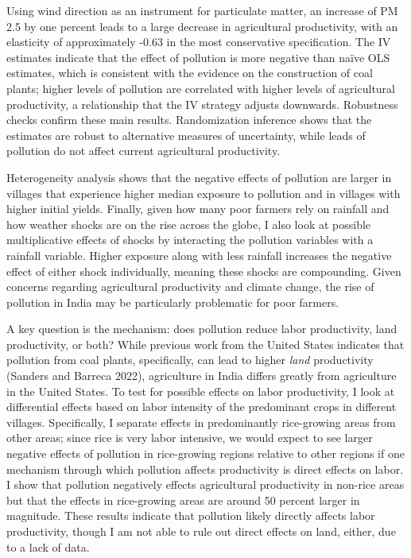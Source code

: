 \documentclass[
]{article}
\begin{document}
Using wind direction as an instrument for particulate matter, an increase of PM 2.5 by one percent leads to a large decrease in agricultural productivity, with an elasticity of approximately -0.63 in the most conservative specification. The IV estimates indicate that the effect of pollution is more negative than naïve OLS estimates, which is consistent with the evidence on the construction of coal plants; higher levels of pollution are correlated with higher levels of agricultural productivity, a relationship that the IV strategy adjusts downwards. Robustness checks confirm these main results. Randomization inference shows that the estimates are robust to alternative measures of uncertainty, while leads of pollution do not affect current agricultural productivity.

Heterogeneity analysis shows that the negative effects of pollution are larger in villages that experience higher median exposure to pollution and in villages with higher initial yields. Finally, given how many poor farmers rely on rainfall and how weather shocks are on the rise across the globe, I also look at possible multiplicative effects of shocks by interacting the pollution variables with a rainfall variable. Higher exposure along with less rainfall increases the negative effect of either shock individually, meaning these shocks are compounding. Given concerns regarding agricultural productivity and climate change, the rise of pollution in India may be particularly problematic for poor farmers.

A key question is the mechanism: does pollution reduce labor productivity, land productivity, or both? While previous work from the United States indicates that pollution from coal plants, specifically, can lead to higher \emph{land} productivity (Sanders and Barreca 2022), agriculture in India differs greatly from agriculture in the United States. To test for possible effects on labor productivity, I look at differential effects based on labor intensity of the predominant crops in different villages. Specifically, I separate effects in predominantly rice-growing areas from other areas; since rice is very labor intensive, we would expect to see larger negative effects of pollution in rice-growing regions relative to other regions if one mechanism through which pollution affects productivity is direct effects on labor. I show that pollution negatively effects agricultural productivity in non-rice areas but that the effects in rice-growing areas are around 50 percent larger in magnitude. These results indicate that pollution likely directly affects labor productivity, though I am not able to rule out direct effects on land, either, due to a lack of data.
\end{document}
